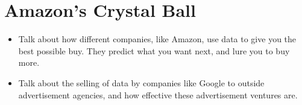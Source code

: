 \documentclass[../../fulltext/fulltext.tex]{subfiles}
\begin{document}
\chapter{Amazon's Crystal Ball}
\begin{itemize}
	\item Talk about how different companies, like Amazon, use data to give you the best possible buy.  They predict what you want next, and lure you to buy more.
	\item Talk about the selling of data by companies like Google to outside advertisement agencies, and how effective these advertisement ventures are.
\end{itemize}
\end{document}
